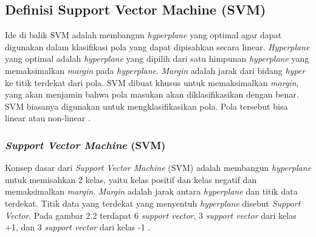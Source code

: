 \subsection{Definisi Support Vector Machine (SVM)}
Ide di balik SVM adalah membangun \textit{hyperplane} yang optimal 
agar dapat digunakan dalam klasifikasi pola yang dapat dipisahkan secara 
linear. \textit{Hyperplane} yang optimal adalah \textit{hyperplane} 
yang dipilih dari satu himpunan \textit{hyperplane} yang memaksimalkan 
\textit{margin} pada \textit{hyperplane}. \textit{Margin }adalah 
jarak dari bidang \textit{hyper} ke titik terdekat dari pola. SVM 
dibuat khusus untuk memaksimalkan \textit{margin}, yang akan menjamin 
bahwa pola masukan akan diklasifikasikan dengan benar. SVM biasanya 
digunakan untuk mengklasifikasikan pola. Pola tersebut bisa linear atau 
non-linear \cite{7}. 
\subsubsection{\textit{Support Vector Machine} (SVM)}
Konsep dasar dari \textit{Support Vector Machine }(SVM)\textit{ }
adalah membangun \textit{hyperplane} untuk memisahkan 2 kelas, yaitu 
kelas positif dan kelas negatif dan memaksimalkan \textit{margin}. 
\textit{Margin }adalah jarak antara \textit{hyperplane }dan titik 
data terdekat. Titik data yang terdekat yang menyentuh \textit{
	hyperplane }disebut \textit{Support Vector}. Pada gambar 2.2 
terdapat 6 \textit{support vector}, 3 \textit{support vector }dari 
kelas +1, dan 3 \textit{support vector }dari kelas -1 \cite{16}.

\begin{adjustbox}{width=1\textwidth}
\noindent\begin{minipage}{\linewidth}
\end{minipage}
\end{adjustbox}

